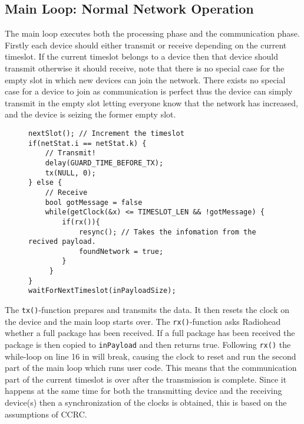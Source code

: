 \subsection{Main Loop: Normal Network Operation}
The main loop executes both the processing phase and the communication phase.
Firstly each device should either transmit or receive depending on the current timeslot. 
If the current timeslot belongs to a device then that device should transmit otherwise it should receive, note that there is no special case for the empty slot in which new devices can join the network.
There exists no special case for a device to join as communication is perfect thus the device can simply transmit in the empty slot letting everyone know that the network has increased, and the device is seizing the former empty slot.
\begin{figure}
\begin{lstlisting}[style=customc,caption={Main loop deciding whether to transmit or receive.},label={lst:ccrc:rxortx}]
nextSlot(); // Increment the timeslot
if(netStat.i == netStat.k) { 
    // Transmit!
    delay(GUARD_TIME_BEFORE_TX);
    tx(NULL, 0);
} else {
    // Receive
    bool gotMessage = false
    while(getClock(&x) <= TIMESLOT_LEN && !gotMessage) {
        if(rx()){
            resync(); // Takes the infomation from the recived payload.
            foundNetwork = true;
        }
     }
}
waitForNextTimeslot(inPayloadSize);
\end{lstlisting}
\end{figure}

\bigskip \noindent
The \texttt{tx()}-function prepares and transmits the data.
It then resets the clock on the device and the main loop starts over.
The \texttt{rx()}-function asks Radiohead whether a full package has been received. 
If a full package has been received the package is then copied to \texttt{inPayload} and then returns true.
Following \texttt{rx()} the while-loop on line 16 in  will break, causing the clock to reset and run the second part of the main loop which runs user code.
This means that the communication part of the current timeslot is over after the transmission is complete.
Since it happens at the same time for both the transmitting device and the receiving device(s) then a synchronization of the clocks is obtained, this is based on the assumptions of CCRC. 